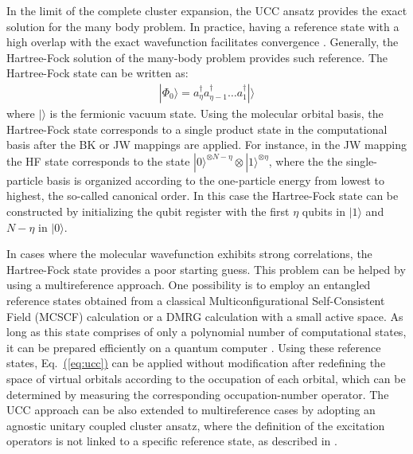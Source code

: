 \documentclass[superscriptaddress,aps,pra,twocolumn,nofootinbib,babel]{revtex4-1}
\newcommand{\eq}[1]{Eq.~\hyperref[eq:#1]{(\ref*{eq:#1})}}
\begin{document}
In the limit of the complete cluster expansion, the UCC ansatz provides the exact solution for the many body problem. In practice, having a reference state with a high overlap with the exact wavefunction facilitates convergence \cite{Lyakh.CR.112.182.2011}. Generally, the Hartree-Fock solution of the many-body problem provides such reference. The Hartree-Fock state can be written as:
\begin{align}
|\Phi_{0}\rangle = a^{\dagger}_{\eta} a^{\dagger}_{\eta-1} \dots a^{\dagger}_{1} |\rangle
\end{align}
where $|\rangle$ is the fermionic vacuum state. Using the molecular orbital basis, the Hartree-Fock state corresponds to a single product state in the computational basis after the BK or JW mappings are applied. For instance, in the JW mapping the HF state corresponds to the state $|0\rangle^{\otimes N-\eta}\otimes |1\rangle^{\otimes \eta}$, where the the single-particle basis is organized according to the one-particle energy from lowest to highest, the so-called canonical order. In this case the Hartree-Fock state can be constructed by initializing the qubit register with the first $\eta$ qubits in $|1\rangle$ and $N-\eta$ in $|0\rangle$. %

In cases where the molecular wavefunction exhibits strong correlations, the Hartree-Fock state provides a poor starting guess. This problem can be helped by using a multireference approach. One possibility is to employ an entangled reference states obtained from a classical Multiconfigurational Self-Consistent Field (MCSCF) calculation \cite{Szalay.CR.112.108.2011} or a DMRG calculation with a small active space. As long as this state comprises of only a polynomial number of computational states, it can be prepared efficiently on a quantum computer \cite{Ortiz.PRA.64.22319.2001,somma.PRA.65.042323.2002,wang.PRA.79.042335.2009}. Using these reference states, \eq{ucc} can be applied without modification after redefining the space of virtual orbitals according to the occupation of each orbital, which can be determined by measuring the corresponding occupation-number operator. The UCC approach can be also extended to multireference cases by adopting an agnostic unitary coupled cluster ansatz, where the definition of the excitation operators is not linked to a specific reference state, as described in \cite{Mcclean.NJP.18.023023.2016}.
\end{document}
